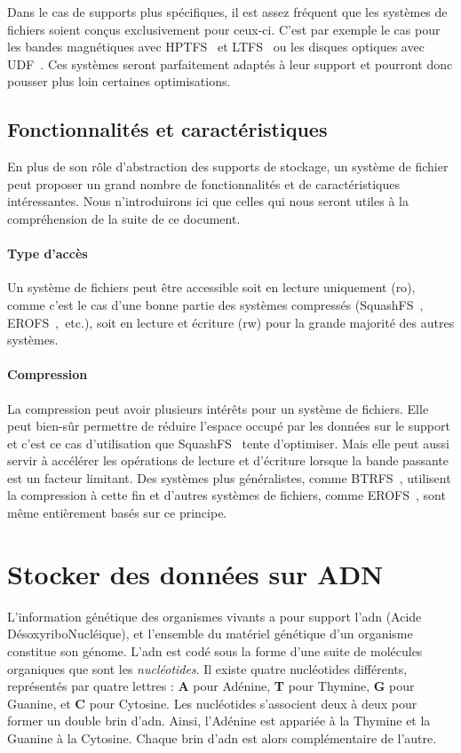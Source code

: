 \documentclass[a4paper]{report}
\makeatletter
\newcommand{\btrfs}{BTRFS~\cite{rodeh2013btrfs}\@\xspace}
\newcommand{\erofs}{EROFS~\cite{gao2019erofs}\@\xspace}
\newcommand{\hptfs}{HPTFS~\cite{zhang2006hptfs}\@\xspace}
\newcommand{\ltfs}{LTFS~\cite{pease2010linear}\@\xspace}
\newcommand{\squashfs}{SquashFS~\cite{lougher2009squashfs}\@\xspace}
\newcommand{\udf}{UDF~\cite{optical2003universal}\@\xspace}
\makeatother
\begin{document}
Dans le cas de supports plus spécifiques, il est assez fréquent que les systèmes de fichiers soient conçus exclusivement pour ceux-ci.
C'est par exemple le cas pour les bandes magnétiques avec \hptfs et \ltfs ou les disques optiques avec \udf.
Ces systèmes seront parfaitement adaptés à leur support et pourront donc pousser plus loin certaines optimisations.

\subsection{Fonctionnalités et caractéristiques}

En plus de son rôle d'abstraction des supports de stockage,
un système de fichier peut proposer un grand nombre de fonctionnalités et de caractéristiques intéressantes.
Nous n'introduirons ici que celles qui nous seront utiles à la compréhension de la suite de ce document.

\paragraph{Type d'accès}
Un système de fichiers peut être accessible soit en lecture uniquement (\ac{ro}),
comme c'est le cas d'une bonne partie des systèmes compressés (\squashfs, \erofs,~etc.),
soit en lecture et écriture (\ac{rw}) pour la grande majorité des autres systèmes.

\paragraph{Compression}
La compression peut avoir plusieurs intérêts pour un système de fichiers.
Elle peut bien-sûr permettre de réduire l'espace occupé par les données sur le support
et c'est ce cas d'utilisation que \squashfs tente d'optimiser.
Mais elle peut aussi servir à accélérer les opérations de lecture et d'écriture lorsque la bande passante est un facteur limitant.
Des systèmes plus généralistes, comme \btrfs, utilisent la compression à cette fin
et d'autres systèmes de fichiers, comme \erofs, sont même entièrement basés sur ce principe.


\section{Stocker des données sur ADN}

L'information génétique des organismes vivants a pour support l'\ac{adn} (Acide DésoxyriboNucléique), et l'ensemble du matériel génétique d'un organisme constitue son génome.
L'\ac{adn} est codé sous la forme d'une suite de molécules organiques que sont les \emph{nucléotides}.
Il existe quatre nucléotides différents, représentés par quatre lettres : \textbf{A} pour Adénine, \textbf{T} pour Thymine, \textbf{G} pour Guanine, et \textbf{C} pour Cytosine.
Les nucléotides s'associent deux à deux pour former un double brin d'\ac{adn}.
Ainsi, l'Adénine est appariée à la Thymine et la Guanine à la Cytosine.
Chaque brin d'\ac{adn} est alors complémentaire de l'autre.
\end{document}
